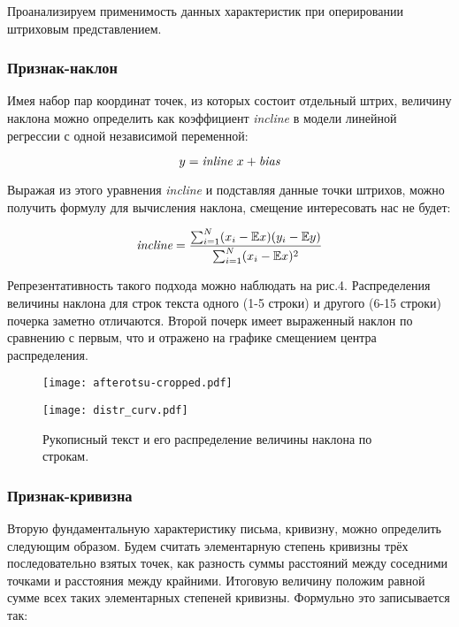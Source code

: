 \documentclass{article}
\begin{document}
Проанализируем применимость данных характеристик при оперировании штриховым представлением. 
\subsubsection{Признак-наклон}
Имея набор пар координат точек, из которых состоит отдельный штрих, величину наклона можно определить как коэффициент \emph{incline} в модели линейной регрессии с одной независимой переменной:

\begin{equation}
y = \emph{inline}~ x + \emph{bias}
\end{equation}

Выражая из этого уравнения \emph{incline} и подставляя данные точки штрихов, можно получить формулу для вычисления наклона, смещение интересовать нас не будет:

\begin{equation}
\emph{incline} = \frac{\sum_{i=1}^{N}(x_i - \mathbb{E}x)(y_i - \mathbb{E}y)}{\sum_{i=1}^{N}(x_i - \mathbb{E}x)^2}
\end{equation}

Репрезентативность такого подхода можно наблюдать на рис.4. Распределения величины наклона для строк текста одного (1-5 строки) и другого (6-15 строки) почерка заметно отличаются. Второй почерк имеет выраженный наклон по сравнению с первым, что и отражено на графике смещением центра распределения. 

\begin{figure}[h]
\begin{minipage}[h]{0.5\linewidth}
    \centering
    \texttt{[image: afterotsu-cropped.pdf]} 
\end{minipage}
\hfill
\begin{minipage}[h]{0.46\linewidth}
    \centering
    \texttt{[image: distr\_curv.pdf]}
\end{minipage}
\caption{Рукописный текст и его распределение величины наклона по строкам.}
\end{figure}

\subsubsection{Признак-кривизна}
Вторую фундаментальную характеристику письма, кривизну, можно определить следующим образом. Будем считать элементарную степень кривизны трёх последовательно взятых точек, как разность суммы расстояний между соседними точками и расстояния между крайними. Итоговую величину положим равной сумме всех таких элементарных степеней кривизны. Формульно это записывается так:
\end{document}
